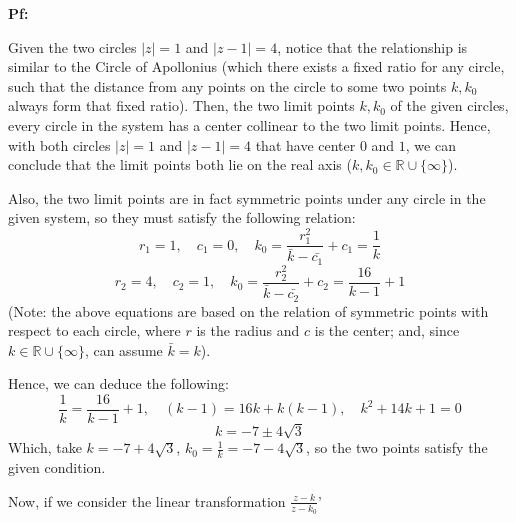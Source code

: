 \documentclass{article}
\begin{document}
\textbf{Pf:}

Given the two circles $|z|=1$ and $|z-1|=4$, notice that the relationship is similar to the Circle of Apollonius 
(which there exists a fixed ratio for any circle, such that the distance from any points on the circle to some two points $k,k_0$ always form that fixed ratio).
Then, the two limit points $k,k_0$ of the given circles, every circle in the system has a center collinear to the two limit points.
Hence, with both circles $|z|=1$ and $|z-1|=4$ that have center $0$ and $1$, we can conclude that the limit points both lie on the real axis ($k,k_0\in\mathbb{R}\cup\{\infty\}$).

\hfill

Also, the two limit points are in fact symmetric points under any circle in the given system, so they must satisfy the following relation:
$$r_1=1,\quad c_1=0,\quad k_0=\frac{r_1^2}{\bar{k}-\bar{c_1}}+c_1 = \frac{1}{k}$$
$$r_2=4,\quad c_2=1,\quad k_0=\frac{r_2^2}{\bar{k}-\bar{c_2}}+c_2=\frac{16}{k-1}+1$$
(Note: the above equations are based on the relation of symmetric points with respect to each circle, where $r$ is the radius and $c$ is the center; and, since $k\in\mathbb{R}\cup\{\infty\}$, can assume $\bar{k}=k$).

Hence, we can deduce the following:
$$\frac{1}{k}=\frac{16}{k-1}+1,\quad (k-1)=16k+k(k-1),\quad k^2+14k+1=0$$
$$k=-7\pm 4\sqrt{3}$$
Which, take $k=-7+4\sqrt{3}$, $k_0=\frac{1}{k}=-7-4\sqrt{3}$, so the two points satisfy the given condition.

\hfill

Now, if we consider the linear transformation $\frac{z-k}{z-k_0}$'
\end{document}
